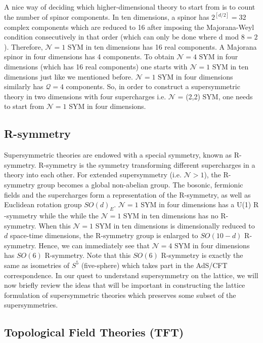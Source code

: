 A nice way of deciding which higher-dimensional theory to start from is to count the number of spinor components.  
In ten dimensions, a spinor has $2^{[d/2]} = 32$ complex components which are reduced to 16 after imposing the 
Majorana-Weyl condition consecutively in that order (which can only be done where d mod $8 = 2$). 
Therefore, $\mathcal{N}=1$ SYM in ten dimensions has 16 real components. 
A Majorana spinor in four dimensions has 4 components. To obtain
$\mathcal{N}=4$ SYM in four dimensions (which has 16 real components) 
one starts with $\mathcal{N}=1$ SYM in ten dimensions just like we mentioned before. 
$\mathcal{N}=1$ SYM in four dimensions similarly has $\mathcal{Q}=4$ components. 
So, in order to construct a supersymmetric theory in two dimensions with four supercharges i.e. $\mathcal{N}$ = (2,2) SYM, 
one needs to start from $\mathcal{N}=1$ SYM in four dimensions. 


\subsection{R-symmetry} 

Supersymmetric theories are endowed with a special symmetry, known as R-symmetry. 
R-symmetry is the symmetry transforming different supercharges in a theory into each other. 
For extended supersymmetry (i.e. $\mathcal{N} > 1$), the R-symmetry group becomes a 
global non-abelian group. The bosonic, fermionic fields and the supercharges form a representation of the 
R-symmetry, as well as Euclidean rotation group $SO(d)_{E}$.
$\mathcal{N}=1$ SYM in four dimensions has a U(1) R
-symmetry while the while the $\mathcal{N}=1$
SYM in ten dimensions has no R-symmetry. 
When this $\mathcal{N}=1$ SYM in ten dimensions is dimensionally reduced to $d$ space-time 
dimensions, the R-symmetry group is enlarged to $SO(10-d)$ R-symmetry. Hence, we can immediately 
see that $\mathcal{N}=4$ SYM in four dimensions has $SO(6)$ R-symmetry.
Note that this $SO(6)$ R-symmetry is exactly the same as isometries of $S^{5}$ (five-sphere) 
which takes part in the AdS/CFT correspondence. 
In our quest to understand supersymmetry on the lattice, we will now briefly review
the ideas that will be important in constructing the lattice formulation of supersymmetric theories
which preserves some subset of the supersymmetries. 



\subsection{Topological Field Theories (TFT)}

